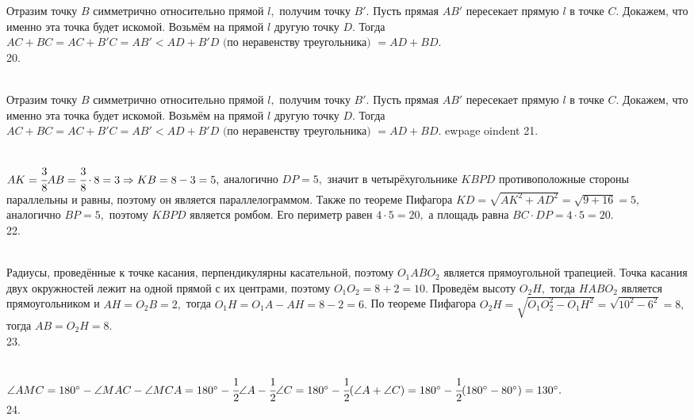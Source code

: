Отразим точку $B$ симметрично относительно прямой $l,$ получим точку $B'.$ Пусть прямая $AB'$ пересекает прямую $l$ в точке $C.$ Докажем, что именно эта точка будет искомой. Возьмём на прямой $l$ другую точку $D.$ Тогда $AC+BC=AC+B'C=AB'<AD+B'D\text{ (по неравенству треугольника) }=AD+BD.$\\
20. \begin{figure}[ht!]
\end{figure}\\
Отразим точку $B$ симметрично относительно прямой $l,$ получим точку $B'.$ Пусть прямая $AB'$ пересекает прямую $l$ в точке $C.$ Докажем, что именно эта точка будет искомой. Возьмём на прямой $l$ другую точку $D.$ Тогда $AC+BC=AC+B'C=AB'<AD+B'D\text{ (по неравенству треугольника) }=AD+BD.$
ewpage
oindent
21. \begin{figure}[ht!]
\end{figure}\\
$AK=\cfrac{3}{8}AB=\cfrac{3}{8}\cdot8=3\Rightarrow KB=8-3=5,$ аналогично $DP=5,$ значит в четырёхугольнике $KBPD$ противоположные стороны параллельны и равны, поэтому он является параллелограммом. Также по теореме Пифагора $KD=\sqrt{AK^2+AD^2}=\sqrt{9+16}=5,$ аналогично $BP=5,$ поэтому $KBPD$ является ромбом. Его периметр равен $4\cdot5=20,$ а площадь равна $BC\cdot DP=4\cdot5=20.$\\
22. \begin{figure}[ht!]
\end{figure}\\
Радиусы, проведённые к точке касания, перпендикулярны касательной, поэтому $O_1ABO_2$ является прямоугольной трапецией. Точка касания двух окружностей лежит на одной прямой с их центрами, поэтому $O_1O_2=8+2=10.$ Проведём высоту $O_2H,$ тогда $HABO_2$ является прямоугольником и $AH=O_2B=2,$ тогда $O_1H=O_1A-AH=8-2=6.$ По теореме Пифагора $O_2H=\sqrt{O_1O_2^2-O_1H^2}=\sqrt{10^2-6^2}=8,$ тогда $AB=O_2H=8.$\\
23. \begin{figure}[ht!]
\end{figure}\\
$\angle AMC=180^\circ-\angle MAC-\angle MCA=180^\circ-\cfrac{1}{2}\angle A-\cfrac{1}{2}\angle C=180^\circ-\cfrac{1}{2}(\angle A+\angle C)=
180^\circ-\cfrac{1}{2}(180^\circ-80^\circ)=130^\circ.$\\
24. \begin{figure}[ht!]
\end{figure}\\
